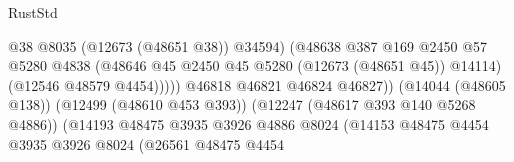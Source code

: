\begin{lexlean}{RustStd}
\begin{coremodule}
                                                            @38
                                                            @8035
                                                            (@12673 (@48651 @38))
                                                            @34594)
                                                          (@48638
                                                            @387
                                                            @169
                                                            @2450
                                                            @57
                                                            @5280
                                                            @4838
                                                            (@48646
                                                              @45
                                                              @2450
                                                              @45
                                                              @5280
                                                              (@12673 (@48651 @45))
                                                              @14114)
                                                            (@12546 @48579 @4454)))))
                                                    @46818
                                                    @46821
                                                    @46824
                                                    @46827))
                                                (@14044 (@48605 @138))
                                                (@12499 (@48610 @453 @393))
                                                (@12247 (@48617 @393 @140 @5268 @4886))
                                                (@14193
                                                  @48475
                                                  @3935
                                                  @3926
                                                  @4886
                                                  @8024
                                                  (@14153
                                                    @48475
                                                    @4454
                                                    @3935
                                                    @3926
                                                    @8024
                                                    (@26561
                                                      @48475
                                                      @4454

\end{coremodule}
\end{lexlean}
